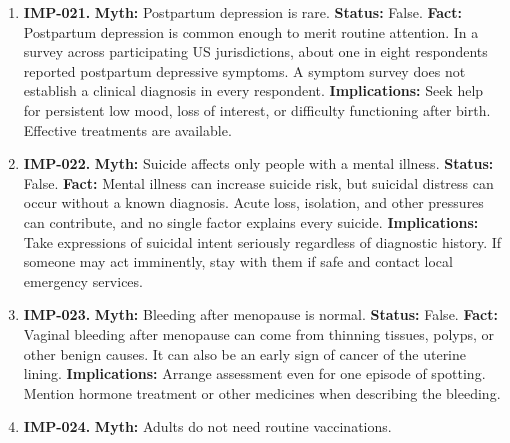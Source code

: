 \documentclass[11pt,oneside]{book}
\begin{document}
\begin{enumerate}[leftmargin=0pt,labelwidth=0pt,labelsep=0pt,itemindent=0pt]
\textbf{Fact:} Blinded controlled studies have not found a consistent increase in children's activity or change in behavior after sugar consumption. Excitement at parties can coincide with sweets and make the association seem stronger. \cite{ref7}\newline
\textbf{Implications:} Limit added sugar for established nutritional and dental reasons. Evaluate persistent attention or behavior concerns on their own merits.
\item[] \textbf{IMP-021.} \textbf{Myth:} Postpartum depression is rare.\newline
\textbf{Status:} False.\newline
\textbf{Fact:} Postpartum depression is common enough to merit routine attention. In a survey across participating US jurisdictions, about one in eight respondents reported postpartum depressive symptoms. A symptom survey does not establish a clinical diagnosis in every respondent. \cite{ref406}\newline
\textbf{Implications:} Seek help for persistent low mood, loss of interest, or difficulty functioning after birth. Effective treatments are available.
\item[] \textbf{IMP-022.} \textbf{Myth:} Suicide affects only people with a mental illness.\newline
\textbf{Status:} False.\newline
\textbf{Fact:} Mental illness can increase suicide risk, but suicidal distress can occur without a known diagnosis. Acute loss, isolation, and other pressures can contribute, and no single factor explains every suicide. \cite{ref64}\newline
\textbf{Implications:} Take expressions of suicidal intent seriously regardless of diagnostic history. If someone may act imminently, stay with them if safe and contact local emergency services.
\item[] \textbf{IMP-023.} \textbf{Myth:} Bleeding after menopause is normal.\newline
\textbf{Status:} False.\newline
\textbf{Fact:} Vaginal bleeding after menopause can come from thinning tissues, polyps, or other benign causes. It can also be an early sign of cancer of the uterine lining. \cite{ref65}\newline
\textbf{Implications:} Arrange assessment even for one episode of spotting. Mention hormone treatment or other medicines when describing the bleeding.
\item[] \textbf{IMP-024.} \textbf{Myth:} Adults do not need routine vaccinations.\newline

\end{enumerate}
\end{document}
